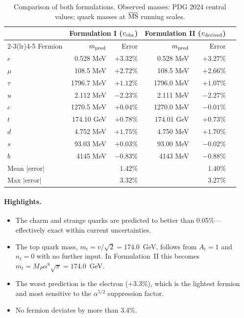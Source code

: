 \documentclass[11pt,a4paper]{article}
\theoremstyle{definition}
\theoremstyle{remark}
\begin{document}
\begin{table}[h]
\centering
\renewcommand{\arraystretch}{1.15}
\begin{tabular}{lrrrrr}
\toprule
& \multicolumn{2}{c}{Formulation I ($v_{\rm obs}$)}
& \multicolumn{2}{c}{Formulation II ($v_{\rm derived}$)} \\
\cmidrule(lr){2-3}\cmidrule(lr){4-5}
Fermion & $m_{\rm pred}$ & Error
  & $m_{\rm pred}$ & Error \\
\midrule
$e$   & 0.528 MeV  & $+3.32\%$ & 0.528 MeV  & $+3.27\%$ \\
$\mu$ & 108.5 MeV  & $+2.72\%$ & 108.5 MeV  & $+2.66\%$ \\
$\tau$& 1796.7 MeV & $+1.12\%$ & 1796.0 MeV & $+1.07\%$ \\
$u$   & 2.112 MeV  & $-2.23\%$ & 2.111 MeV  & $-2.27\%$ \\
$c$   & 1270.5 MeV & $+0.04\%$ & 1270.0 MeV & $-0.01\%$ \\
$t$   & 174.10 GeV & $+0.78\%$ & 174.01 GeV & $+0.73\%$ \\
$d$   & 4.752 MeV  & $+1.75\%$ & 4.750 MeV  & $+1.70\%$ \\
$s$   & 93.03 MeV  & $+0.03\%$ & 93.00 MeV  & $-0.02\%$ \\
$b$   & 4145 MeV   & $-0.83\%$ & 4143 MeV   & $-0.88\%$ \\
\midrule
\multicolumn{2}{l}{Mean $|$error$|$}
  & $\mathbf{1.42\%}$
  & & $\mathbf{1.40\%}$ \\
\multicolumn{2}{l}{Max $|$error$|$}
  & $3.32\%$
  & & $3.27\%$ \\
\bottomrule
\end{tabular}
\caption{Comparison of both formulations. Observed masses:
  PDG 2024 central values;
  quark masses at $\overline{\rm MS}$ running scales.}
\label{tab:comparison}
\end{table}

\paragraph{Highlights.}
\begin{itemize}
\item The charm and strange quarks are predicted to better than
  0.05\%---effectively exact within current uncertainties.
\item The top quark mass, $m_t = v/\!\sqrt{2} = 174.0$~GeV, follows
  from $A_t = 1$ and $n_t = 0$ with no further input.
  In Formulation~II this becomes
  $m_t = M_P\alpha^8\sqrt{\pi} = 174.0$~GeV.
\item The worst prediction is the electron ($+3.3\%$), which is
  the lightest fermion and most sensitive to the $\alpha^{5/2}$
  suppression factor.
\item No fermion deviates by more than 3.4\%.
\end{itemize}
\end{document}
